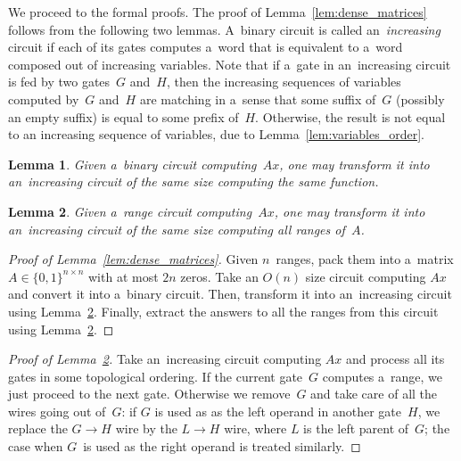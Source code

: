 \documentclass[11pt,letterpaper]{article}
\newtheorem{lemma}{Lemma}
\begin{document}
We proceed to the formal proofs. The proof of Lemma~\ref{lem:dense_matrices} follows from the following two lemmas. A~binary circuit is called an~{\em increasing} circuit if each of its gates computes a~word that is equivalent to a~word composed out of increasing variables.
Note that if a~gate in an~increasing circuit is fed by two gates~$G$ and~$H$, then the increasing sequences of variables computed by~$G$ and~$H$ are matching in a~sense that some suffix of~$G$ (possibly an empty suffix) is equal to some prefix of~$H$. Otherwise, the result is not equal to an increasing sequence of variables, due to Lemma~\ref{lem:variables_order}.

\begin{lemma}\label{lemma:correctorder}
Given a~binary circuit computing~$Ax$, one may transform it into an~increasing circuit of the same size computing the same function.
\end{lemma}

\begin{lemma}\label{lemma:matrixranges}
Given a~range circuit computing~$Ax$, one may transform it into an~increasing circuit of the same size computing all ranges of~$A$.
\end{lemma}

\begin{proof}[Proof of Lemma~\ref{lem:dense_matrices}]
Given $n$~ranges, pack them into a~matrix $A \in \{0,1\}^{n \times n}$ with at most $2n$ zeros. Take an $O(n)$ size circuit computing $Ax$ and convert it into a~binary circuit. Then, transform it into an~increasing circuit using Lemma~\ref{lemma:matrixranges}. Finally, extract the answers to all the ranges from this circuit using Lemma~\ref{lemma:matrixranges}.
\end{proof}

\begin{proof}[Proof of Lemma~\ref{lemma:matrixranges}]
Take an~increasing circuit computing $Ax$ and process all its gates in some topological ordering. If the current gate~$G$ computes a~range, we just proceed to the next gate. Otherwise we remove~$G$ and take care of all the wires going out of~$G$: if $G$ is used as as the left operand in another gate~$H$, we replace the $G \to H$ wire by the $L \to H$ wire, where $L$ is the left parent of~$G$; the case when $G$~is used as the right operand is treated similarly.


\end{proof}
\end{document}

